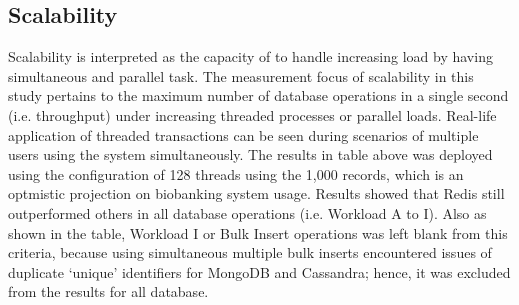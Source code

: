 \documentclass[5p]{elsarticle}
\begin{document}
\subsection{Scalability}
Scalability is interpreted as the capacity of to   handle increasing load by having simultaneous and parallel task. 
The measurement focus of scalability in this study pertains to the maximum number of database operations in a single second (i.e. throughput) 
under increasing threaded processes or parallel loads.  Real-life application of threaded transactions can be seen during scenarios of multiple 
users using the system simultaneously. The results in table above was deployed using the configuration of 128 threads 
using the 1,000 records, which is an optmistic projection on biobanking system usage. 
Results showed that Redis still outperformed others in all database operations (i.e. Workload A to I).  
Also as shown in the table, Workload I or Bulk Insert operations was left blank from this criteria, because using simultaneous multiple bulk inserts 
encountered issues of duplicate ‘unique’ identifiers for MongoDB and Cassandra; hence, it was excluded from the results for all database.
													
\end{document}
